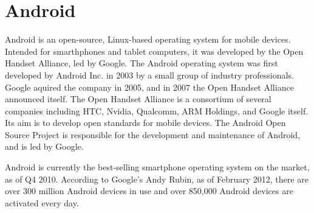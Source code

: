 \section{Android}
\label{sec:android}

Android is an open-source, Linux-based operating system for mobile devices. Intended for smarthphones and tablet computers, it was developed by the Open Handset Alliance, led by Google. The Android operating system was first developed by Android Inc. in 2003 by a small group of industry professionals. Google aquired the company in 2005, and in 2007 the Open Handset Alliance announced itself. The Open Handset Alliance is a consortium of several companies including HTC, Nvidia, Qualcomm, ARM Holdings, and Google itself\cite{oha_members}. Its aim is to develop open standards for mobile devices. The Android Open Source Project is responsible for the development and maintenance of Android, and is led by Google.

Android is currently the best-selling smartphone operating system on the market\cite{android_top}, as of Q4 2010. According to Google's Andy Rubin, as of February 2012, there are over 300 million Android devices in use and over 850,000 Android devices are activated every day\cite{android_sold}.
